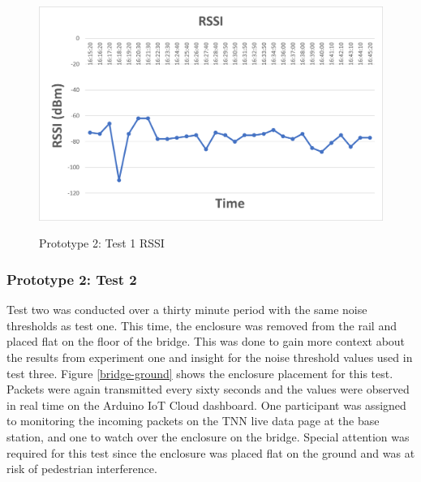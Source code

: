 \begin{figure}[H]
	\centering
	\caption{Prototype 2: Test 1 RSSI}
	\includegraphics[width=\textwidth]{Sections/Prototype-Testing/proto2-test1-rssi.png}
	\label{proto2-test1-rssi}
\end{figure}

\subsubsection{Prototype 2: Test 2}
Test two was conducted over a thirty minute period with the same noise thresholds as test one. This time, the enclosure was removed from the rail and placed flat on the floor of the bridge. This was done to gain more context about the results from experiment one and insight for the noise threshold values used in test three. Figure \ref{bridge-ground} shows the enclosure placement for this test. Packets were again transmitted every sixty seconds and the values were observed in real time on the Arduino IoT Cloud dashboard. One participant was assigned to monitoring the incoming packets on the TNN live data page at the base station, and one to watch over the enclosure on the bridge. Special attention was required for this test since the enclosure was placed flat on the ground and was at risk of pedestrian interference. 

